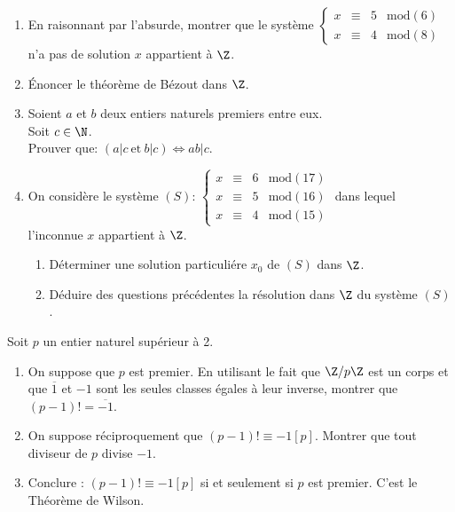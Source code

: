 \begin{exercice}
\begin{enumerate}
    \item En raisonnant par l'absurde, montrer que le système 
    $\left\{\begin{array}{lccl}
    x&\equiv&5& \text{mod}(6)\\
    x&\equiv&4&\text{mod}(8)
    \end{array}\right.$ n'a pas de solution $x$ appartient à $\Z$.

    \item Énoncer le théorème de Bézout dans $\Z$.

    \item Soient $a$ et $b$ deux entiers naturels premiers entre eux. \\
    Soit $c\in \N$.\\
    \medskip
    Prouver que:  $\left( a|c\:\text{et} \:b|c\right) \iff ab|c$.

    \item On considère le système $(S)$: 
    $\left\{\begin{array}{lccl}
    x&\equiv&6& \text{mod}(17)\\
    x&\equiv&5& \text{mod}(16)\\
    x&\equiv&4&\text{mod}(15)
    \end{array}\right.$ dans lequel l'inconnue $x$ appartient à $\Z$.
    \begin{enumerate}
        \item Déterminer une solution particuliére $x_0$ de $(S)$ dans $\Z$.

        \item Déduire des questions précédentes la résolution dans $\Z$ du système $(S)$.
    \end{enumerate}
\end{enumerate}    
\end{exercice}

\begin{exercice}
Soit $p$ un entier naturel supérieur à 2. 
\begin{enumerate}
 \item[a)] On suppose que $p$ est premier. En utilisant le fait que $\Z/p\Z$ est un corps et que $\overline{1}$ et $-1$ sont les seules classes égales à leur inverse, montrer que $(p-1)!=\overline{-1}$. 
 \item[b)] On suppose réciproquement que $(p-1)!\equiv-1[p]$. Montrer que tout diviseur de $p$ divise $-1$. 
 \item[c)] Conclure : $(p-1)!\equiv-1[p]$ si et seulement si $p$ est premier. C'est le Théorème de Wilson. 
\end{enumerate}
\end{exercice}

